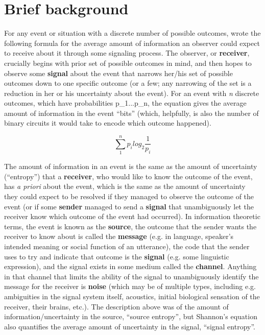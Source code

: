 \documentclass[12pt]{article}
\begin{document}
\section{Brief background}

For any event or situation with a discrete number of possible outcomes, \citet{shannon1948} wrote the following formula for the average amount of information an observer could expect to receive about it through some signaling process. The observer, or \textbf{receiver}, crucially begins with prior set of possible outcomes in mind, and then hopes to observe some \textbf{signal} about the event that narrows her/his set of possible outcomes down to one specific outcome (or a few; any narrowing of the set is a reduction in her or his uncertainty about the event).  For an event with \textsl{n} discrete outcomes, which have probabilities p_1...p_n, the equation gives the average amount of information in the event ``bits'' (which, helpfully, is also the number of binary circuits it would take to encode which outcome happened).

\begin{center}
	$$\sum_{1}^{n} p_i log_2 \frac{1}{p_i}$$
\end{center}

The amount of information in an event is the same as the amount of uncertainty (``entropy'') that a \textbf{receiver}, who would like to know the outcome of the event, has \textsl{a priori} about the event, which is the same as the amount of uncertainty they could expect to be resolved if they managed to observe the outcome of the event (or if some \textbf{sender} managed to send a \textbf{signal} that unambiguously let the receiver know which outcome of the event had occurred). In information theoretic terms, the event is known as the \textbf{source}, the outcome that the sender wants the receiver to know about is called the \textbf{message} (e.g. in language, speaker's intended meaning or social function of an utterance), the code that the sender uses to try and indicate that outcome is the \textbf{signal} (e.g. some linguistic expression), and the signal exists in some medium called the \textbf{channel}. Anything in that channel that limits the ability of the signal to unambiguously identify the message for the receiver is \textbf{noise} (which may be of multiple types, including e.g. ambiguities in the signal system itself, acoustics, initial biological sensation of the receiver, their brains, etc.). The description above was of the amount of information/uncertainty in the source, ``source entropy'', but Shannon's equation also quantifies the average amount of uncertainty in the signal, ``signal entropy''.
\end{document}
